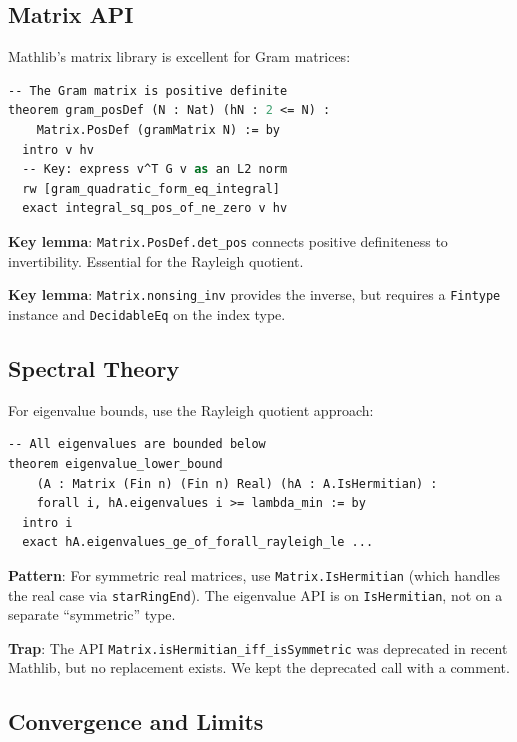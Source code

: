 \documentclass[11pt,a4paper]{article}
\newcommand{\lean}[1]{\texttt{#1}}
\begin{document}
\subsection{Matrix API}

Mathlib's matrix library is excellent for Gram matrices:

\begin{lstlisting}[language=ML,caption={Positive definiteness}]
-- The Gram matrix is positive definite
theorem gram_posDef (N : Nat) (hN : 2 <= N) :
    Matrix.PosDef (gramMatrix N) := by
  intro v hv
  -- Key: express v^T G v as an L2 norm
  rw [gram_quadratic_form_eq_integral]
  exact integral_sq_pos_of_ne_zero v hv
\end{lstlisting}

\textbf{Key lemma}: \lean{Matrix.PosDef.det\_pos} connects positive
definiteness to invertibility. Essential for the Rayleigh quotient.

\textbf{Key lemma}: \lean{Matrix.nonsing\_inv} provides the inverse,
but requires a \lean{Fintype} instance and \lean{DecidableEq} on
the index type.

\subsection{Spectral Theory}

For eigenvalue bounds, use the Rayleigh quotient approach:

\begin{lstlisting}[language=ML,caption={Rayleigh quotient bound}]
-- All eigenvalues are bounded below
theorem eigenvalue_lower_bound
    (A : Matrix (Fin n) (Fin n) Real) (hA : A.IsHermitian) :
    forall i, hA.eigenvalues i >= lambda_min := by
  intro i
  exact hA.eigenvalues_ge_of_forall_rayleigh_le ...
\end{lstlisting}

\textbf{Pattern}: For symmetric real matrices, use
\lean{Matrix.IsHermitian} (which handles the real case via
\lean{starRingEnd}). The eigenvalue API is on \lean{IsHermitian},
not on a separate ``symmetric'' type.

\textbf{Trap}: The API \lean{Matrix.isHermitian\_iff\_isSymmetric}
was deprecated in recent Mathlib, but no replacement exists. We kept
the deprecated call with a comment.

\subsection{Convergence and Limits}
\end{document}
